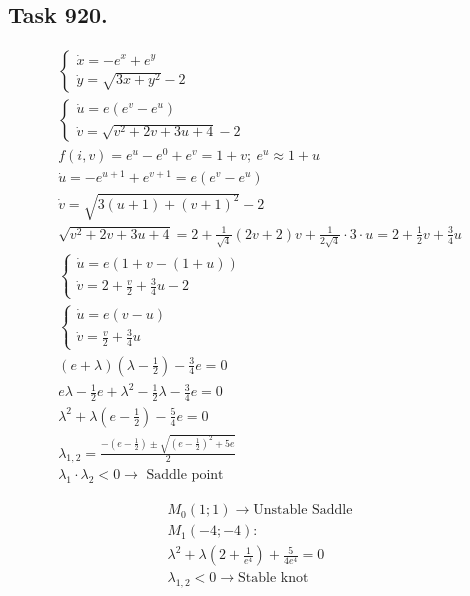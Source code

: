 \documentclass{article}
\begin{document}
\subsection*{Task 920.}

\addtolength{\jot}{1pt}
\begin{fleqn}[1\parindent]
  \begin{gather*}
    \begin{cases}
      \dot{x}=-e^x+e^y \\ 
      \dot{y}=\sqrt{3x+y^2}-2 
    \end{cases} \\ 
    \begin{cases}
      \dot{u}=e(e^v-e^u) \\ 
      \dot{v}=\sqrt{v^2+2v+3u+4}-2
    \end{cases} \\ 
    f(i,v)=e^u-e^0+e^v=1+v;\ e^u \approx 1+u \\ 
    \dot{u}=-e^{u+1}+e^{v+1}=e(e^v-e^u) \\ 
    \dot{v}=\sqrt{3(u+1)+(v+1)^2}-2 \\
    \sqrt{v^2+2v+3u+4}=2+\frac{1}{\sqrt{4}}(2v+2)v+\frac{1}{2\sqrt{4}}\cdot 3 \cdot u = 
    2+\frac{1}{2}v+\frac{3}{4}u \\ 
    \begin{cases}
      \dot{u}=e(1+v-(1+u)) \\ 
      \dot{v}=2+\frac{v}{2}+\frac{3}{4}u-2
    \end{cases} \\ 
    \begin{cases}
      \dot{u}=e(v-u) \\ 
      \dot{v} =\frac{v}{2}+\frac{3}{4}u
    \end{cases} \\ 
    (e+\lambda)(\lambda-\frac{1}{2})-\frac{3}{4}e=0 \\ 
    e\lambda-\frac{1}{2}e+\lambda^2-\frac{1}{2}\lambda-\frac{3}{4}e=0 \\
    \lambda^2+\lambda(e - \frac{1}{2})-\frac{5}{4}e=0 \\ 
    \lambda_{1,2}=\frac{-(e-\frac{1}{2})\pm\sqrt{(e-\frac{1}{2})^2+5e}}{2} \\
    \boxed{\lambda_1\cdot\lambda_2 < 0 \rightarrow \text{ Saddle point}}
  \end{gather*}
\end{fleqn}

\addtolength{\jot}{1pt}
\begin{fleqn}[1\parindent]
  \begin{gather*}
    M_0(1;1) \rightarrow \boxed{\text{Unstable Saddle}} \\
    M_1(-4;-4): \\ 
    \lambda^2 +\lambda(2+\frac{1}{e^4})+\frac{5}{4e^4}=0 \\ 
    \lambda_{1,2} < 0 \rightarrow \boxed{\text{Stable knot}}
  \end{gather*}
\end{fleqn}
\end{document}
